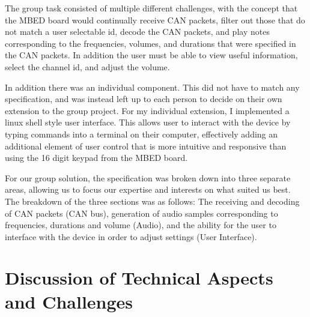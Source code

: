 \par\bigskip\noindent
The group task consisted of multiple different challenges, with the concept
that the MBED board would continually receive CAN packets, filter out those 
that do not match a user selectable id, decode the CAN packets, and play notes 
corresponding to the frequencies, volumes, and durations that were specified in 
the CAN packets. In addition the user must be able to view useful information, 
select the channel id, and adjust the volume. 

\par\bigskip\noindent
In addition there was an individual component. This did not have to match any 
specification, and was instead left up to each person to decide on their own 
extension to the group project. For my individual extension, I implemented a 
linux shell style user interface. This allows user to interact with the device 
by typing commands into a terminal on their computer, effectively adding an 
additional element of user control that is more intuitive and responsive than 
using the 16 digit keypad from the MBED board.

\par\bigskip\noindent
For our group solution, the specification was broken down into three separate 
areas, allowing us to focus our expertise and interests on what suited us best.
The breakdown of the three sections was as follows: The receiving and 
decoding of CAN packets (CAN bus), generation of audio samples corresponding to 
frequencies, durations and volume (Audio), and the ability for the user to 
interface with the device in order to adjust settings (User Interface). 

\section{Discussion of Technical Aspects and Challenges}

